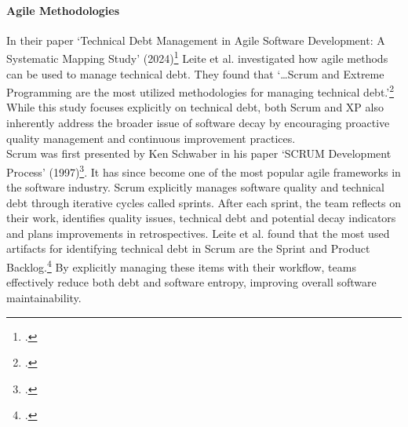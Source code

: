\paragraph{Agile Methodologies}
In their paper `Technical Debt Management in Agile Software Development: A Systematic Mapping Study' (2024)\footcite{leiteTechnicalDebtManagement2024} Leite et al.
investigated how agile methods can be used to manage technical debt. They found that `\ldots Scrum and Extreme Programming are the most utilized methodologies 
for managing technical debt.'\footcite[318]{leiteTechnicalDebtManagement2024} While this study focuses explicitly on technical debt, both Scrum and \ac{XP}
also inherently address the broader issue of software decay by encouraging proactive quality management and continuous improvement practices.\\
Scrum was first presented by Ken Schwaber in his paper `SCRUM Development Process' (1997)\footcite{schwaberSCRUMDevelopmentProcess1997}. 
It has since become one of the most popular agile frameworks in the software industry. Scrum explicitly manages software quality and technical debt through iterative cycles called sprints.
After each sprint, the team reflects on their work, identifies quality issues, technical debt and potential decay indicators and plans improvements in
retrospectives. Leite et al. found that the most used artifacts for identifying technical debt in Scrum are the Sprint and Product Backlog.\footcite[315]{leiteTechnicalDebtManagement2024}
By explicitly managing these items with their workflow, teams effectively reduce both debt and software entropy, improving overall software maintainability.\\

